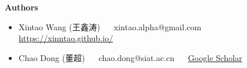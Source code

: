 \documentclass[../main.tex]{subfiles}
\begin{document}
\newpage

{\Large\textbf{Authors}}

\begin{itemize}
	\item Xintao Wang (王鑫涛) ~~ xintao.alpha@gmail.com ~~ \url{https://xinntao.github.io/}
	\item Chao Dong (董超) ~~ chao.dong@siat.ac.cn ~~ \href{https://scholar.google.com.hk/citations?user=OSDCB0UAAAAJ}{Google Scholar}
\end{itemize}
\end{document}
